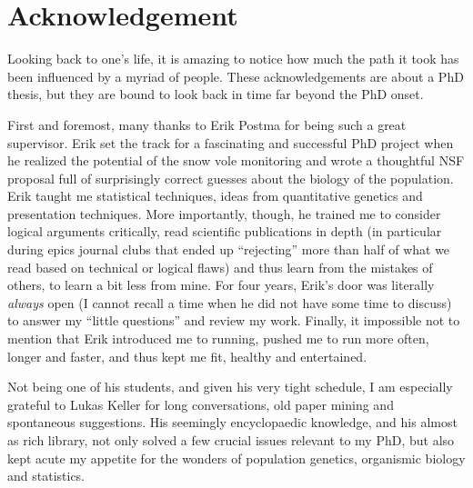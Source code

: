 
\chapter{Acknowledgement}

Looking back to one's life, it is amazing to notice how much the path it took has been influenced by a myriad of people. These acknowledgements are about a PhD thesis, but they are bound to look back in time far beyond the PhD onset.

First and foremost, many thanks to Erik Postma for being such a great supervisor. Erik set the track for a fascinating and successful PhD project when he realized the potential of the snow vole monitoring and wrote a thoughtful NSF proposal full of surprisingly correct guesses about the biology of the population. Erik taught me statistical techniques, ideas from quantitative genetics and presentation techniques. More importantly, though, he trained me to consider logical arguments critically, read scientific publications in depth (in particular during epics journal clubs that ended up ``rejecting'' more than half of what we read based on technical or logical flaws) and thus learn from the mistakes of others, to learn a bit less from mine. For four years, Erik's door was literally \emph{always} open (I cannot recall a time when he did not have some time to discuss) to answer my ``little questions'' and review my work.
Finally, it impossible not to mention that Erik introduced me to running, pushed me to run more often, longer and faster, and thus kept me fit, healthy and entertained.

Not being one of his students, and given his very tight schedule, I am especially grateful to Lukas Keller for long conversations, old paper mining and spontaneous suggestions. His seemingly encyclopaedic knowledge, and his almost as rich library, not only solved a few crucial issues relevant to my PhD, but also kept acute my appetite for the wonders of population genetics, organismic biology and statistics. 

